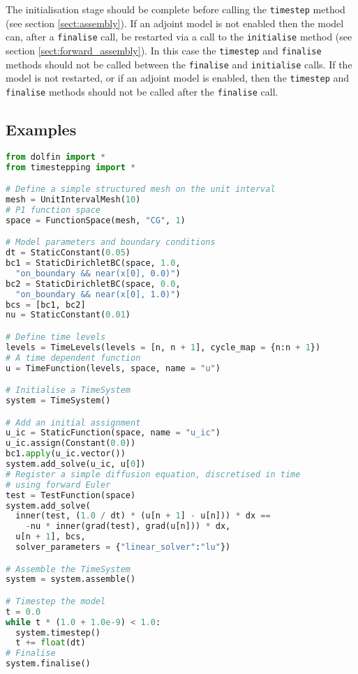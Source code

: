 \documentclass[a4paper]{book}
\begin{document}
The initialisation stage should be complete before calling the \verb+timestep+
method (see section \ref{sect:assembly}). If an adjoint model is not enabled
then the model can, after a \verb+finalise+ call, be restarted via a call to the
\verb+initialise+ method (see section \ref{sect:forward_assembly}). In this case
the \verb+timestep+ and \verb+finalise+ methods should not be called between the
\verb+finalise+ and \verb+initialise+ calls. If the model is not restarted, or
if an adjoint model is enabled, then the \verb+timestep+ and \verb+finalise+
methods should not be called after the \verb+finalise+ call.

\subsection*{Examples}

\begin{lstlisting}[language = python, frame = single, basicstyle=\footnotesize]
from dolfin import *
from timestepping import *

# Define a simple structured mesh on the unit interval
mesh = UnitIntervalMesh(10)
# P1 function space
space = FunctionSpace(mesh, "CG", 1)

# Model parameters and boundary conditions
dt = StaticConstant(0.05)
bc1 = StaticDirichletBC(space, 1.0,
  "on_boundary && near(x[0], 0.0)")
bc2 = StaticDirichletBC(space, 0.0,
  "on_boundary && near(x[0], 1.0)")
bcs = [bc1, bc2]
nu = StaticConstant(0.01)

# Define time levels
levels = TimeLevels(levels = [n, n + 1], cycle_map = {n:n + 1})
# A time dependent function
u = TimeFunction(levels, space, name = "u")

# Initialise a TimeSystem
system = TimeSystem()

# Add an initial assignment
u_ic = StaticFunction(space, name = "u_ic")
u_ic.assign(Constant(0.0))
bc1.apply(u_ic.vector())
system.add_solve(u_ic, u[0])
# Register a simple diffusion equation, discretised in time
# using forward Euler
test = TestFunction(space)
system.add_solve(
  inner(test, (1.0 / dt) * (u[n + 1] - u[n])) * dx ==
    -nu * inner(grad(test), grad(u[n])) * dx,
  u[n + 1], bcs,
  solver_parameters = {"linear_solver":"lu"})

# Assemble the TimeSystem
system = system.assemble()

# Timestep the model
t = 0.0
while t * (1.0 + 1.0e-9) < 1.0:
  system.timestep()
  t += float(dt)
# Finalise
system.finalise()
\end{lstlisting}
\end{document}
